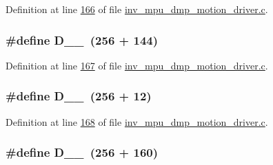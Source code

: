 Definition at line \hyperlink{inv__mpu__dmp__motion__driver_8c_source_l00166}{166} of file \hyperlink{inv__mpu__dmp__motion__driver_8c_source}{inv\+\_\+mpu\+\_\+dmp\+\_\+motion\+\_\+driver.\+c}.

\subsubsection[{\texorpdfstring{D\+\_\+1\+\_\+128}{D_1_128}}]{\setlength{\rightskip}{0pt plus 5cm}\#define D\+\_\+\_~(256 + 144)}\hypertarget{group___d_r_i_v_e_r_s_ga782fd500c37614a9a83b50adf3f18a2d}{}\label{group___d_r_i_v_e_r_s_ga782fd500c37614a9a83b50adf3f18a2d}


Definition at line \hyperlink{inv__mpu__dmp__motion__driver_8c_source_l00167}{167} of file \hyperlink{inv__mpu__dmp__motion__driver_8c_source}{inv\+\_\+mpu\+\_\+dmp\+\_\+motion\+\_\+driver.\+c}.

\subsubsection[{\texorpdfstring{D\+\_\+1\+\_\+152}{D_1_152}}]{\setlength{\rightskip}{0pt plus 5cm}\#define D\+\_\+\_~(256 + 12)}\hypertarget{group___d_r_i_v_e_r_s_ga3248b12d5c7a9f33e19f32da0822ce60}{}\label{group___d_r_i_v_e_r_s_ga3248b12d5c7a9f33e19f32da0822ce60}


Definition at line \hyperlink{inv__mpu__dmp__motion__driver_8c_source_l00168}{168} of file \hyperlink{inv__mpu__dmp__motion__driver_8c_source}{inv\+\_\+mpu\+\_\+dmp\+\_\+motion\+\_\+driver.\+c}.

\subsubsection[{\texorpdfstring{D\+\_\+1\+\_\+160}{D_1_160}}]{\setlength{\rightskip}{0pt plus 5cm}\#define D\+\_\+\_~(256 + 160)}\hypertarget{group___d_r_i_v_e_r_s_ga97169732d7858751120c9b32109f5875}{}\label{group___d_r_i_v_e_r_s_ga97169732d7858751120c9b32109f5875}


